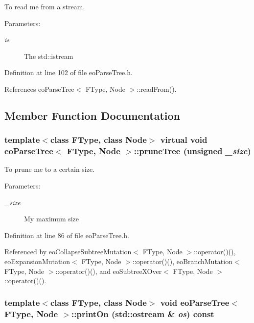 To read me from a stream. 

\begin{Desc}
\item[Parameters:]
\begin{description}
\item[{\em is}]The std::istream \end{description}
\end{Desc}


Definition at line 102 of file eo\-Parse\-Tree.h.

References eo\-Parse\-Tree$<$ FType, Node $>$::read\-From().

\subsection{Member Function Documentation}
\subsubsection{\setlength{\rightskip}{0pt plus 5cm}template$<$class FType, class Node$>$ virtual void {\bf eo\-Parse\-Tree}$<$ FType, Node $>$::prune\-Tree (unsigned {\em \_\-size})\hspace{0.3cm}{\tt  [inline, virtual]}}\label{classeo_parse_tree_a2}


To prune me to a certain size. 

\begin{Desc}
\item[Parameters:]
\begin{description}
\item[{\em \_\-size}]My maximum size \end{description}
\end{Desc}


Definition at line 86 of file eo\-Parse\-Tree.h.

Referenced by eo\-Collapse\-Subtree\-Mutation$<$ FType, Node $>$::operator()(), eo\-Expansion\-Mutation$<$ FType, Node $>$::operator()(), eo\-Branch\-Mutation$<$ FType, Node $>$::operator()(), and eo\-Subtree\-XOver$<$ FType, Node $>$::operator()().
\subsubsection{\setlength{\rightskip}{0pt plus 5cm}template$<$class FType, class Node$>$ void {\bf eo\-Parse\-Tree}$<$ FType, Node $>$::print\-On (std::ostream \& {\em os}) const\hspace{0.3cm}{\tt  [inline, virtual]}}\label{classeo_parse_tree_a5}


